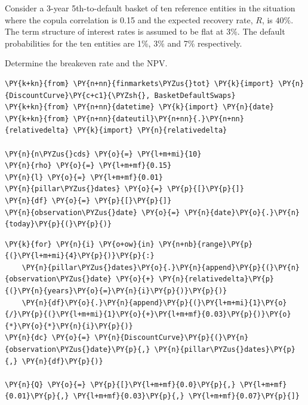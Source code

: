 \begin{Exercise}[title={(Basket Default Swap)}]
Consider a 3-year 5th-to-default basket of ten
reference entities in the situation where the copula correlation is 0.15
and the expected recovery rate, \(R\), is \(40\%\). The term structure
of interest rates is assumed to be flat at 3\%. The default
probabilities for the ten entities are 1\%, 3\% and 7\% respectively.

Determine the breakeven rate and the NPV.
\end{Exercise}
\begin{Answer}	
\begin{tcolorbox}[size=fbox, boxrule=1pt, colback=cellbackground, colframe=cellborder]
\begin{Verbatim}[commandchars=\\\{\}]
\PY{k+kn}{from} \PY{n+nn}{finmarkets\PYZus{}tot} \PY{k}{import} \PY{n}{DiscountCurve}\PY{c+c1}{\PYZsh{}, BasketDefaultSwaps}
\PY{k+kn}{from} \PY{n+nn}{datetime} \PY{k}{import} \PY{n}{date}
\PY{k+kn}{from} \PY{n+nn}{dateutil}\PY{n+nn}{.}\PY{n+nn}{relativedelta} \PY{k}{import} \PY{n}{relativedelta}
	
\PY{n}{n\PYZus{}cds} \PY{o}{=} \PY{l+m+mi}{10}
\PY{n}{rho} \PY{o}{=} \PY{l+m+mf}{0.15}
\PY{n}{l} \PY{o}{=} \PY{l+m+mf}{0.01}
\PY{n}{pillar\PYZus{}dates} \PY{o}{=} \PY{p}{[}\PY{p}{]}
\PY{n}{df} \PY{o}{=} \PY{p}{[}\PY{p}{]}
\PY{n}{observation\PYZus{}date} \PY{o}{=} \PY{n}{date}\PY{o}{.}\PY{n}{today}\PY{p}{(}\PY{p}{)}
\end{Verbatim}
\end{tcolorbox}	

\begin{tcolorbox}[size=fbox, boxrule=1pt, colback=cellbackground, colframe=cellborder]
\begin{Verbatim}[commandchars=\\\{\}]
\PY{k}{for} \PY{n}{i} \PY{o+ow}{in} \PY{n+nb}{range}\PY{p}{(}\PY{l+m+mi}{4}\PY{p}{)}\PY{p}{:}
    \PY{n}{pillar\PYZus{}dates}\PY{o}{.}\PY{n}{append}\PY{p}{(}\PY{n}{observation\PYZus{}date} \PY{o}{+} \PY{n}{relativedelta}\PY{p}{(}\PY{n}{years}\PY{o}{=}\PY{n}{i}\PY{p}{)}\PY{p}{)}
    \PY{n}{df}\PY{o}{.}\PY{n}{append}\PY{p}{(}\PY{l+m+mi}{1}\PY{o}{/}\PY{p}{(}\PY{l+m+mi}{1}\PY{o}{+}\PY{l+m+mf}{0.03}\PY{p}{)}\PY{o}{*}\PY{o}{*}\PY{n}{i}\PY{p}{)}
\PY{n}{dc} \PY{o}{=} \PY{n}{DiscountCurve}\PY{p}{(}\PY{n}{observation\PYZus{}date}\PY{p}{,} \PY{n}{pillar\PYZus{}dates}\PY{p}{,} \PY{n}{df}\PY{p}{)}
	
\PY{n}{Q} \PY{o}{=} \PY{p}{[}\PY{l+m+mf}{0.0}\PY{p}{,} \PY{l+m+mf}{0.01}\PY{p}{,} \PY{l+m+mf}{0.03}\PY{p}{,} \PY{l+m+mf}{0.07}\PY{p}{]}
	

\end{Verbatim}
\end{tcolorbox}
\end{Answer}
